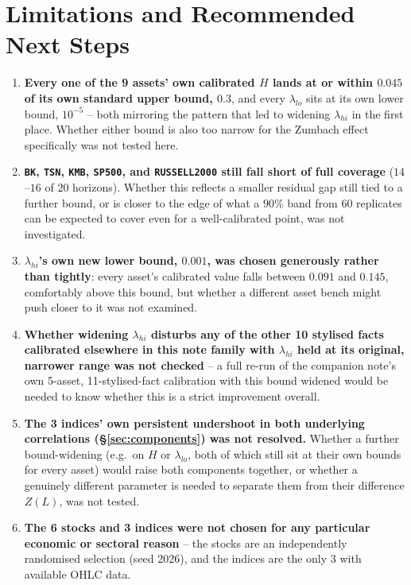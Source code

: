 \documentclass[11pt]{article}
\begin{document}
\section{Limitations and Recommended Next Steps}
\begin{enumerate}
\item \textbf{Every one of the 9 assets' own calibrated $H$ lands at or
within $0.045$ of its own standard upper bound, $0.3$}, and every
$\lambda_{lo}$ sits at its own lower bound, $10^{-5}$ -- both mirroring the
pattern that led to widening $\lambda_{hi}$ in the first place. Whether
either bound is also too narrow for the Zumbach effect specifically was not
tested here.
\item \textbf{\texttt{BK}, \texttt{TSN}, \texttt{KMB}, \texttt{SP500}, and
\texttt{RUSSELL2000} still fall short of full coverage} ($14$--$16$ of $20$
horizons). Whether this reflects a smaller residual gap still tied to a
further bound, or is closer to the edge of what a $90\%$ band from 60
replicates can be expected to cover even for a well-calibrated point, was
not investigated.
\item \textbf{$\lambda_{hi}$'s own new lower bound, $0.001$, was chosen
generously rather than tightly}: every asset's calibrated value falls
between $0.091$ and $0.145$, comfortably above this bound, but whether a
different asset bench might push closer to it was not examined.
\item \textbf{Whether widening $\lambda_{hi}$ disturbs any of the other 10
stylised facts calibrated elsewhere in this note family with $\lambda_{hi}$
held at its original, narrower range was not checked} -- a full re-run of
the companion note's own 5-asset, 11-stylised-fact calibration with this
bound widened would be needed to know whether this is a strict improvement
overall.
\item \textbf{The 3 indices' own persistent undershoot in both underlying
correlations (\S\ref{sec:components}) was not resolved.} Whether a further
bound-widening (e.g.\ on $H$ or $\lambda_{lo}$, both of which still sit at
their own bounds for every asset) would raise both components together, or
whether a genuinely different parameter is needed to separate them from
their difference $Z(L)$, was not tested.
\item \textbf{The 6 stocks and 3 indices were not chosen for any particular
economic or sectoral reason} -- the stocks are an independently randomised
selection (seed 2026), and the indices are the only 3 with available OHLC
data.
\end{enumerate}
\end{document}
